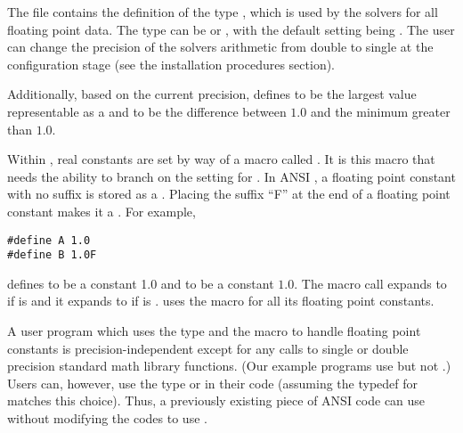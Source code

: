 %
The  file contains the definition of the type ,
which is used by the {\sundials} solvers for all floating point data.
The type  can be  or , with the default setting 
being .
The user can change the precision of the {\sundials} solvers arithmetic from double 
to single at the configuration stage (see the {\sundials} installation procedures section).

Additionally, based on the current precision,  defines 
 to be the largest value representable as a  and
 to be the difference between $1.0$ and the minimum 
greater than $1.0$.

Within {\sundials}, real constants are set by way of a macro called
.  It is this macro that needs the ability to branch on the
setting for .  In ANSI {\C}, a floating point constant with no
suffix is stored as a .  Placing the suffix ``F'' at the
end of a floating point constant makes it a . For example,
\begin{verbatim}
#define A 1.0
#define B 1.0F
\end{verbatim}
defines  to be a  constant 1.0 and  to be a
 constant $1.0$. The macro call 
expands to  if  is  and it expands to
 if  is . {\sundials} uses the  macro for
all its floating point constants. 

A user program which uses the type  and the  macro
to handle floating point constants is precision-independent except for
any calls to single or double precision standard math library
functions.  (Our example programs use  but not
.)  Users can, however, use the type  or
 in their code (assuming the typedef for  matches
this choice).  Thus, a previously existing piece of ANSI {\C} code can use
{\sundials} without modifying the codes to use .
